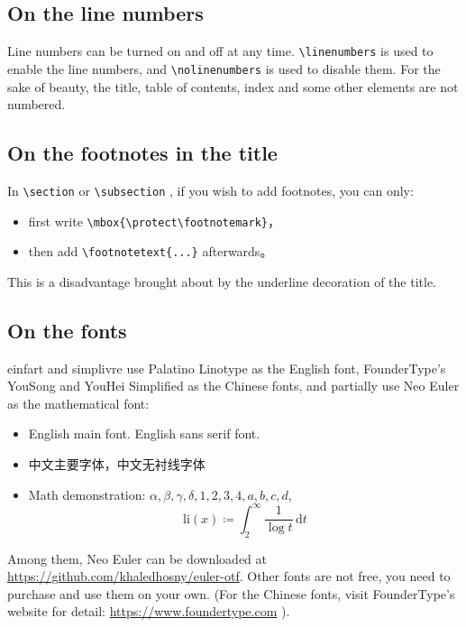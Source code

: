 \documentclass{einfart}
\providecommand{\einfart}{\textsf{einfart}}
\providecommand{\simplivre}{\textsf{simplivre}}
\begin{document}

\subsection{On the line numbers}
Line numbers can be turned on and off at any time. \lstinline|\linenumbers| is used to enable the line numbers, and \lstinline|\nolinenumbers| is used to disable them. For the sake of beauty, the title, table of contents, index and some other elements are not numbered.

\subsection{On the footnotes in the title}
In \lstinline|\section| or \lstinline|\subsection| , if you wish to add footnotes, you can only:
\begin{itemize}
    \item first write \lstinline|\mbox{\protect\footnotemark}|，
    \item then add \lstinline|\footnotetext{...}| afterwards。
\end{itemize}
This is a disadvantage brought about by the underline decoration of the title.

\subsection{On the fonts}
\einfart{} and \simplivre{} use Palatino Linotype as the English font, FounderType's YouSong and YouHei Simplified as the Chinese fonts, and partially use Neo Euler as the mathematical font:
\begin{itemize}
    \item English main font. \textsf{English sans serif font}.
    \item 中文主要字体，\textsf{中文无衬线字体}
    \item Math demonstration: \( \alpha, \beta, \gamma, \delta, 1,2,3,4, a,b,c,d \), \[\mathrm{li}(x)\coloneqq \int_2^{\infty} \frac{1}{\log t}\,\mathrm{d}t \]
\end{itemize}

Among them, Neo Euler can be downloaded at \url{https://github.com/khaledhosny/euler-otf}. Other fonts are not free, you need to purchase and use them on your own. (For the Chinese fonts, visit FounderType's website for detail: \url{https://www.foundertype.com} ).
\end{document}

